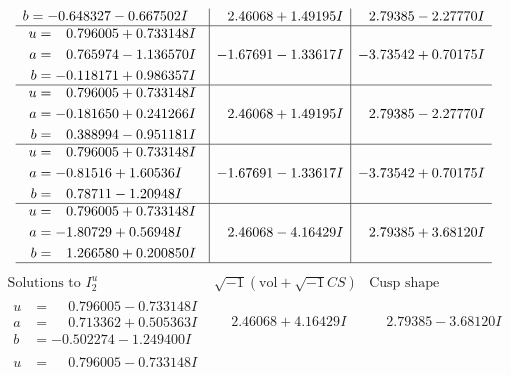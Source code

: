 \documentclass[1p]{elsarticle_modified}
\theoremstyle{definition}
\newcommand{\I}{\sqrt{-1}}
\begin{document}
$$\begin{array}{c|c|c}
\begin{aligned}
b &= -0.648327 - 0.667502 I\end{aligned}
 & \phantom{-}2.46068 + 1.49195 I & \phantom{-}2.79385 - 2.27770 I \\ \hline\begin{aligned}
u &= \phantom{-}0.796005 + 0.733148 I \\
a &= \phantom{-}0.765974 - 1.136570 I \\
b &= -0.118171 + 0.986357 I\end{aligned}
 & -1.67691 - 1.33617 I & -3.73542 + 0.70175 I \\ \hline\begin{aligned}
u &= \phantom{-}0.796005 + 0.733148 I \\
a &= -0.181650 + 0.241266 I \\
b &= \phantom{-}0.388994 - 0.951181 I\end{aligned}
 & \phantom{-}2.46068 + 1.49195 I & \phantom{-}2.79385 - 2.27770 I \\ \hline\begin{aligned}
u &= \phantom{-}0.796005 + 0.733148 I \\
a &= -0.81516 + 1.60536 I \\
b &= \phantom{-}0.78711 - 1.20948 I\end{aligned}
 & -1.67691 - 1.33617 I & -3.73542 + 0.70175 I \\ \hline\begin{aligned}
u &= \phantom{-}0.796005 + 0.733148 I \\
a &= -1.80729 + 0.56948 I \\
b &= \phantom{-}1.266580 + 0.200850 I\end{aligned}
 & \phantom{-}2.46068 - 4.16429 I & \phantom{-}2.79385 + 3.68120 I\\
 \hline 
 \end{array}$$\newpage$$\begin{array}{c|c|c}  
\text{Solutions to }I^u_{2}& \I (\text{vol} + \sqrt{-1}CS) & \text{Cusp shape}\\
 \hline 
\begin{aligned}
u &= \phantom{-}0.796005 - 0.733148 I \\
a &= \phantom{-}0.713362 + 0.505363 I \\
b &= -0.502274 - 1.249400 I\end{aligned}
 & \phantom{-}2.46068 + 4.16429 I & \phantom{-}2.79385 - 3.68120 I \\ \hline\begin{aligned}
u &= \phantom{-}0.796005 - 0.733148 I \\

\end{aligned}
\end{array}$$
\end{document}
